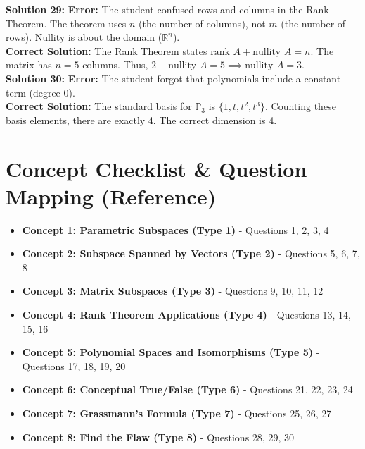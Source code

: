 \documentclass{article}
\begin{document}
\textbf{Solution 29:}
\textbf{Error:} The student confused rows and columns in the Rank Theorem. The theorem uses $n$ (the number of columns), not $m$ (the number of rows). Nullity is about the domain ($\mathbb{R}^n$). \\
\textbf{Correct Solution:} The Rank Theorem states $\text{rank } A + \text{nullity } A = n$. The matrix has $n = 5$ columns. Thus, $2 + \text{nullity } A = 5 \implies \text{nullity } A = 3$. \\

\textbf{Solution 30:}
\textbf{Error:} The student forgot that polynomials include a constant term (degree 0). \\
\textbf{Correct Solution:} The standard basis for $\mathbb{P}_3$ is $\{1, t, t^2, t^3\}$. Counting these basis elements, there are exactly 4. The correct dimension is 4.

\newpage

\section{Concept Checklist \& Question Mapping (Reference)}
\begin{itemize}
    \item \textbf{Concept 1: Parametric Subspaces (Type 1)} - Questions 1, 2, 3, 4
    \item \textbf{Concept 2: Subspace Spanned by Vectors (Type 2)} - Questions 5, 6, 7, 8
    \item \textbf{Concept 3: Matrix Subspaces (Type 3)} - Questions 9, 10, 11, 12
    \item \textbf{Concept 4: Rank Theorem Applications (Type 4)} - Questions 13, 14, 15, 16
    \item \textbf{Concept 5: Polynomial Spaces and Isomorphisms (Type 5)} - Questions 17, 18, 19, 20
    \item \textbf{Concept 6: Conceptual True/False (Type 6)} - Questions 21, 22, 23, 24
    \item \textbf{Concept 7: Grassmann's Formula (Type 7)} - Questions 25, 26, 27
    \item \textbf{Concept 8: Find the Flaw (Type 8)} - Questions 28, 29, 30
\end{itemize}
\end{document}
